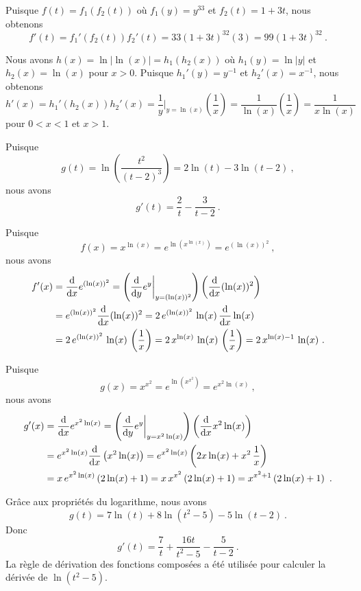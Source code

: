 { Puisque $f(t) = f_1(f_2(t))$ où $f_1(y) = y^{33}$ et
$f_2(t) = 1+3t$, nous obtenons
\[
f'(t) = f_1'(f_2(t)) f_2'(t) = 33(1+3t)^{32} \left( 3\right)
= 99(1+3t)^{32} \ . 
\]

 Nous avons $\displaystyle h(x) = \ln|\ln(x)| = h_1(h_2(x))$ où
$h_1(y) = \ln|y|$ et $h_2(x) = \ln(x)$ pour $x>0$.  Puisque
$h_1'(y) = y^{-1}$ et $h_2'(x) = x^{-1}$, nous obtenons
\[
h'(x) = h_1'(h_2(x)) h_2'(x) = \frac{1}{y}\bigg|_{y=\ln(x)}
\left(\frac{1}{x}\right)
= \frac{1}{\ln(x)} \left(\frac{1}{x}\right)
= \frac{1}{x\ln(x)}
\]
pour $0<x<1$ et $x>1$.

 Puisque
\[
g(t) = \ln\left(\frac{t^2}{(t-2)^3}\right) = 2\ln(t) - 3 \ln(t-2) \ ,
\]
nous avons
\[
g'(t) = \frac{2}{t} - \frac{3}{t-2}  \ .
\]

 Puisque
\[
f(x) = x^{\ln(x)} = e^{\ln(x^{\ln(x)})} = e^{(\ln(x))^2} \ ,
\]
nous avons
\begin{align*}
f'(x) &= \dfdx{e^{(\ln(x))^2}}{x}
=\left(\dfdx{e^y}{y}\bigg|_{y=(\ln(x))^2}\right)
\left(\dfdx{ (\ln(x))^2}{x}\right) \\
& = e^{(\ln(x))^2} \dfdx{(\ln(x))^2}{x}
= 2\, e^{(\ln(x))^2} \, \ln(x)\,\dfdx{\ln(x)}{x} \\
&= 2 \, e^{(\ln(x))^2} \, \ln(x)\,\left(\frac{1}{x}\right)
= 2\, x^{\ln(x)} \, \ln(x)\,\left(\frac{1}{x}\right)
= 2\, x^{\ln(x)-1}\,\ln(x) \ .
\end{align*}

 Puisque
\[
g(x) = x^{x^2} = e^{\ln(x^{x^2})} = e^{x^2 \ln(x)} \ ,
\]
nous avons
\begin{align*}
g'(x) &= \dfdx{e^{x^2\ln(x)}}{x}
= \left(\dfdx{e^y}{y}\bigg|_{y=x^2\ln(x)}\right)
\left(\dfdx{x^2 \ln(x)}{x}\right) \\
&= e^{x^2\ln(x)} \dfdx{\left( x^2\ln(x) \right)}{x}
 = e^{x^2\ln(x)} \left(2x\ln(x) + x^2\, \frac{1}{x}\right) \\
 &= x \, e^{x^2\ln(x)} \left( 2\ln(x) + 1\right)
 = x\, x^{x^2} \left(2\ln(x) +1\right)
 = x^{x^2+1}\left(2\ln(x) + 1\right) \ .
\end{align*}

 Grâce aux propriétés du logarithme, nous avons
\[
g(t) = 7\ln(t) + 8\ln(t^2-5) - 5 \ln(t-2) \ .
\]
Donc
\[
g'(t) = \frac{7}{t} + \frac{16t}{t^2-5} - \frac{5}{t-2} \ .
\]
La règle de dérivation des fonctions composées a été utilisée pour
calculer la dérivée de $\ln(t^2-5)$.
}

